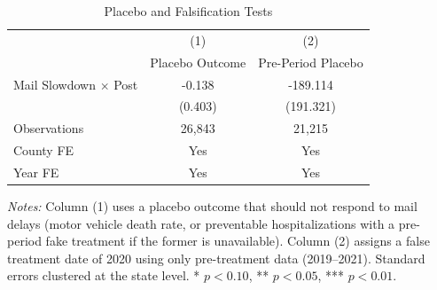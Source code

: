 \begin{table}[htbp]
\centering
\caption{Placebo and Falsification Tests}
\label{tab:placebo}
\begin{tabular}{lcc}
\toprule
 & (1) & (2) \\
 & Placebo Outcome & Pre-Period Placebo \\
\midrule
Mail Slowdown $\times$ Post & -0.138 & -189.114 \\
 & (0.403) & (191.321) \\
\midrule
Observations & 26,843 & 21,215 \\
County FE & Yes & Yes \\
Year FE & Yes & Yes \\
\bottomrule
\end{tabular}
\begin{tablenotes}[flushleft]
\small
\item \textit{Notes:} Column (1) uses a placebo outcome that should not respond to mail delays (motor vehicle death rate, or preventable hospitalizations with a pre-period fake treatment if the former is unavailable). Column (2) assigns a false treatment date of 2020 using only pre-treatment data (2019--2021). Standard errors clustered at the state level. * $p<0.10$, ** $p<0.05$, *** $p<0.01$.
\end{tablenotes}
\end{table}
